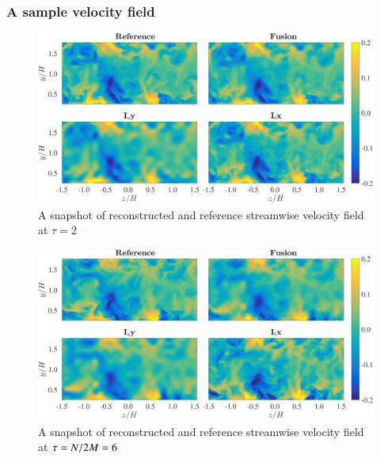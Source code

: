 \documentclass{beamer}
\begin{document}
\begin{frame}
\frametitle{A sample velocity field}
	\begin{overprint}
			\begin{figure}
				\includegraphics[width=\textwidth]{./figures/comparisons/channel/improper_outer_spacespacing_10_timespacing_10_subplots_t002.png}
				\caption*{A snapshot of reconstructed and reference streamwise velocity field at $ \tau = 2 $}
			\end{figure}
			\begin{figure}
				\includegraphics[width=\textwidth]{./figures/comparisons/channel/improper_outer_spacespacing_10_timespacing_10_subplots_t006.png}
				\caption*{A snapshot of reconstructed and reference streamwise velocity field at $ \tau = N/2M  = 6$}
			\end{figure}				
	\end{overprint}
\end{frame}
\end{document}
